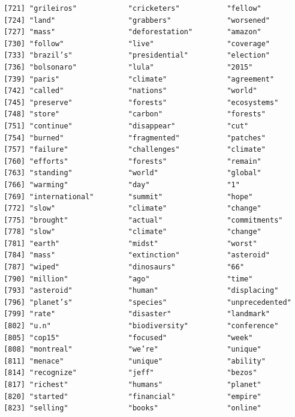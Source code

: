 \documentclass[
  letterpaper,
  DIV=11,
  numbers=noendperiod]{scrartcl}
\begin{document}
\begin{verbatim}
 [721] "grileiros"            "cricketers"           "fellow"              
 [724] "land"                 "grabbers"             "worsened"            
 [727] "mass"                 "deforestation"        "amazon"              
 [730] "follow"               "live"                 "coverage"            
 [733] "brazil’s"             "presidential"         "election"            
 [736] "bolsonaro"            "lula"                 "2015"                
 [739] "paris"                "climate"              "agreement"           
 [742] "called"               "nations"              "world"               
 [745] "preserve"             "forests"              "ecosystems"          
 [748] "store"                "carbon"               "forests"             
 [751] "continue"             "disappear"            "cut"                 
 [754] "burned"               "fragmented"           "patches"             
 [757] "failure"              "challenges"           "climate"             
 [760] "efforts"              "forests"              "remain"              
 [763] "standing"             "world"                "global"              
 [766] "warming"              "day"                  "1"                   
 [769] "international"        "summit"               "hope"                
 [772] "slow"                 "climate"              "change"              
 [775] "brought"              "actual"               "commitments"         
 [778] "slow"                 "climate"              "change"              
 [781] "earth"                "midst"                "worst"               
 [784] "mass"                 "extinction"           "asteroid"            
 [787] "wiped"                "dinosaurs"            "66"                  
 [790] "million"              "ago"                  "time"                
 [793] "asteroid"             "human"                "displacing"          
 [796] "planet’s"             "species"              "unprecedented"       
 [799] "rate"                 "disaster"             "landmark"            
 [802] "u.n"                  "biodiversity"         "conference"          
 [805] "cop15"                "focused"              "week"                
 [808] "montreal"             "we’re"                "unique"              
 [811] "menace"               "unique"               "ability"             
 [814] "recognize"            "jeff"                 "bezos"               
 [817] "richest"              "humans"               "planet"              
 [820] "started"              "financial"            "empire"              
 [823] "selling"              "books"                "online"              

\end{verbatim}
\end{document}
